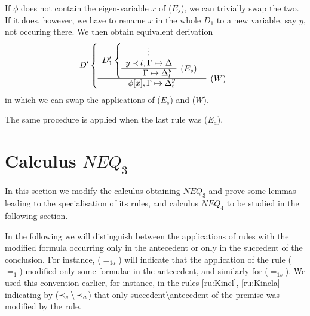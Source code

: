 \begin{PROOF}
\begin{LS}
If $\phi$ does not contain the eigen-variable $x$ of ($E_s$), we can
trivially swap the two. If it does, however, we have to rename $x$ in the
whole $D_1$ to a new variable, say $y$, not occuring there. We then obtain
equivalent derivation 
\[ D' \left \{ \begin{array}{cl}
 D_1' \left \{ \begin{array}{rl}
 \multicolumn{1}{c}{\vdots} \\
 y\Incl t,  \GSD \\ \cline{1-1}
  \GSD_t^y & \rabove{(E_s)} \end{array} \right . \\ \cline{1-1}
 \phi[x], \GSD_t^y & \rabove{(W)} \end{array} \right . \]
in which we can swap the applications of ($E_s$) and ($W$). \\
\item The same procedure is applied when the last rule was ($E_a$).
\end{LS}
\end{PROOF}

\section{Calculus $NEQ_3$}
In this section we modify the calculus obtaining $NEQ_3$ and prove
some lemmas leading to the specialisation of its rules, and calculus $NEQ_4$
to be studied in the following section.

In the following we will distinguish between the applications of rules with 
the modified formula occurring only in the antecedent or only in the succedent
of the conclusion. For instance, ($=_{1a}$) will indicate that the application
of the rule ($=_1$) modified only some formulae in the antecedent, and similarly
for ($=_{1s}$). We used this convention earlier, for instance, 
in the rules \ref{ru:Kincl}, \ref{ru:Kincla}
indicating by ($\mathbin{\prec}_s\setminus \mathbin{\prec}_a$) that only succedent$\setminus$antecedent
 of the premise was modified by the rule.

